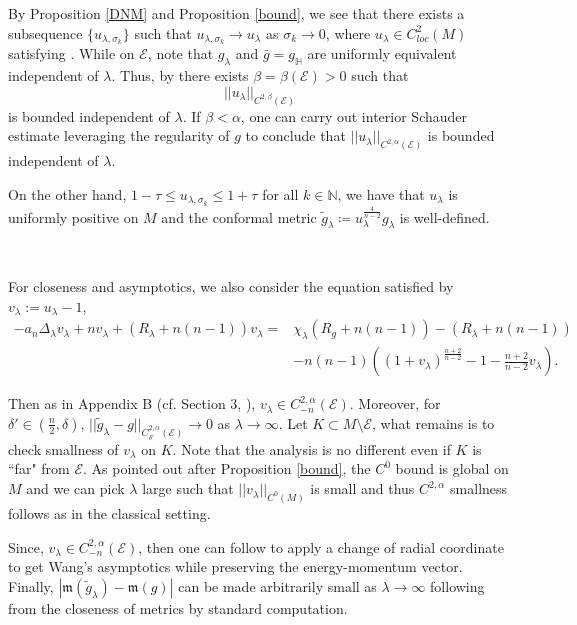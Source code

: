 \documentclass[11pt]{amsart}
\makeatletter
\renewcommand*{\eqref}[1]{%
  \hyperref[{#1}]{\textup{\tagform@{\ref*{#1}}}}%
}
\theoremstyle{remark}
\numberwithin{equation}{section}
\def\a{{\alpha}}
\def\b{{\beta}}
\def\Lp{\Delta}
\def\m{\mathfrak{m}}
\def\l{\lambda}
\def\mE{\mathcal{E}}
\def\mE{\mathcal{E}}
\def\HH{\mathbb{H}}
\def\l {\lambda}
\def\s {\sigma}
\makeatother
\begin{document}
{{By Proposition \ref{DNM} and Proposition \ref{bound}, we see that there exists a subsequence $\{u_{\l,\sigma_k}\}$ such that $u_{\l,\sigma_k}\to u_{\l}$ as $\s_k \to 0$, where $u_{\l}\in C^{2}_{loc}(M)$ satisfying \eqref{DGS}.  While on $\mE$,  note that $g_{\l}$ and $\bar g=g_{\HH}$ are uniformly equivalent independent of $\l$. Thus, by \eqref{Holder} there exists $\beta=\beta(\mE)>0$ such that 
$$||u_{\lambda}||_{C^{2,\b}(\mE)}$$ is bounded independent of $\l$.  If $\b < \a$, one can carry out interior Schauder estimate leveraging the regularity of $g$ to conclude that $||u_{\lambda}||_{C^{2,\a}(\mE)}$ is bounded independent of $\l$.  


On the other hand, $1-\tau \leq u_{\lambda,\sigma_k} \leq 1+\tau$ for all $k\in \mathbb{N}$, we have that $u_\lambda$ is uniformly positive on $M$ and the conformal metric $\tilde g_{\lambda} \coloneqq u_\lambda^{\frac{4}{n-2}}g_\lambda$ is well-defined. 

\

For closeness and asymptotics, we also consider the equation satisfied by $v_{\l}:=u_{\l}-1$, 
\begin{equation}\label{closeness}
\begin{split}
-a_n\Lp_{\l}v_{\l}+nv_{\l}+(R_{\l}+n(n-1))v_{\l}=& \chi_{\l}(R_g+n(n-1))-(R_{\l}+n(n-1))\\
&-n(n-1)\left((1+v_{\l})^{\frac{n+2}{n-2}}-1-\frac{n+2}{n-2}v_{\l} \right). 
\end{split}
\end{equation}

Then as in \cite{DGS} Appendix B (cf. \cite{G} Section 3, \cite{Lee}),  $v_{\lambda}\in C^{2,\a}_{-n}(\mE)$.  Moreover,  for $\delta'\in (\frac{n}{2}, \delta)$, $||\tilde g_{\lambda}-g||_{C^{2,\a}_{\delta'}(\mE)}\to 0$ as $\lambda\to \infty$.  Let $K\subset M\setminus \mE$, what remains is to check smallness of $v_{\lambda}$ on $K$.  Note that the analysis is no different even if $K$ is ``far" from $\mE$. As pointed out after Proposition \ref{bound},  the $C^0$ bound is global on $M$ and we can pick $\lambda$ large such that $||v_{\l}||_{C^0(M)}$ is small and thus  $C^{2,\a}$ smallness follows as in the classical setting.   

Since, $v_{\lambda}\in C^{2,\a}_{-n}(\mE)$, then one can follow \cite[Theorem 5.2]{DS15} to apply a change of radial coordinate to get Wang's asymptotics while preserving the energy-momentum vector.  Finally, $|\m(\tilde g_{\lambda}) -\m(g)|$ can be made arbitrarily small as $\lambda \to \infty$ following from the closeness of metrics by standard computation.   

}}
\end{document}
